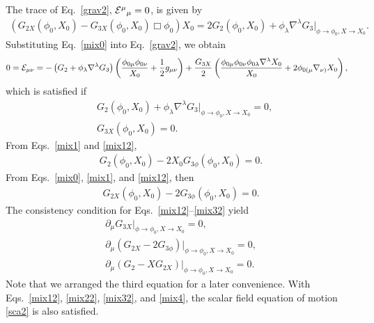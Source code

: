 \documentclass[prd,amsmath,amssymb,floatfix,superscriptaddress,notitlepage,nofootinbib,preprintnumbers]{revtex4-1}
\begin{document}
The trace of Eq.~\eqref{grav2}, 
${\cal E}^\mu{}_\mu=0$,
is given by 
\begin{align}
\label{mix0}
\left(
G_{2X}(\phi_0,X_0)
-G_{3X}(\phi_0,X_0)
\Box\phi_0
\right)X_0
=
2G_2 (\phi_0,X_0)
+\phi_{\lambda}\nabla^\lambda G_3 
 \Big|_{\phi\to\phi_0,X\to X_0}.
\end{align}
Substituting Eq.~\eqref{mix0} into Eq.~\eqref{grav2}, we obtain
\begin{align}
\label{traceless}
0=
{\cal E}_{\mu\nu}
&=
-
\left(
G_2+\phi_\lambda\nabla^\lambda G_3
\right)
\left(
\frac{\phi_{0\mu}\phi_{0\nu}}{X_0}
+\frac{1}{2}g_{\mu\nu}
\right)
+\frac{G_{3X}}{2}
\left(
\frac{\phi_{0\mu} \phi_{0\nu}\phi_{0\lambda}\nabla^\lambda X_0 }{X_0}
+2\phi_{0(\mu}\nabla_{\nu)} X_{0}
\right),
\end{align}
which is satisfied if 
\begin{align}
\label{mix1}
&G_2(\phi_0,X_0) 
+\phi_{\lambda}\nabla^\lambda G_3
 \Big|_{\phi\to\phi_0,X\to X_0}
=0, \\
\label{mix12}
&G_{3X}(\phi_0,X_0)=0.
\end{align}
From Eqs.~\eqref{mix1} and \eqref{mix12},
\begin{align}
 G_2 (\phi_0,X_0)
-2X_0G_{3\phi} (\phi_0,X_0) 
=0.
\label{mix22}
\end{align}
From Eqs.~\eqref{mix0}, \eqref{mix1}, and \eqref{mix12},
then
\begin{align}
G_{2X}(\phi_0,X_0)
-2G_{3\phi}(\phi_0,X_0) 
=0.
\label{mix32}
\end{align}
The consistency condition for Eqs.~\eqref{mix12}--\eqref{mix32} yield
\begin{align}
\label{mix4}
\partial_\mu G_{3X}\Big|_{\phi\to \phi_0,X\to X_0}=0,
\nonumber
\\
\partial_\mu (G_{2X}-2G_{3\phi})|_{\phi\to \phi_0,X\to X_0}=0,
\nonumber
\\
\partial_\mu(G_2-X G_{2X})|_{\phi\to \phi_0,X\to X_0}
=0.
\end{align}
Note that we arranged the third equation for a later convenience.
With Eqs.~\eqref{mix12},
\eqref{mix22}, 
\eqref{mix32},
and 
\eqref{mix4},
the scalar field equation of motion \eqref{sca2} is also satisfied.
\end{document}
